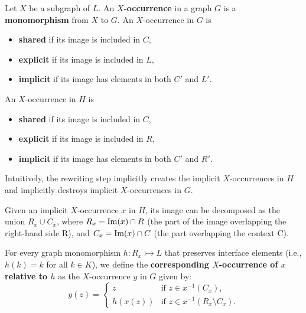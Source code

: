 \begin{definition}
    \label{def:x_occurrence}
     Let $X$ be a subgraph of $L$.  An \textbf{$X$-occurrence} in a graph $G$ is a \textbf{monomorphism} from $X$ to $G$. An $X$-occurrence in $G$ is 
    \begin{itemize}
        \item \textbf{shared} if its image is included in $C$,
        \item \textbf{explicit} if its image is  included in $L$,
        \item \textbf{implicit} if its image has elements in both $C'$ and $L'$.
    \end{itemize}  
    An $X$-occurrence in $H$ is 
    \begin{itemize}
        \item \textbf{shared} if its image is included in $C$,
        \item \textbf{explicit} if its image is included in $R$,
        \item \textbf{implicit} if its image has elements in both $C'$ and $R'$.
    \end{itemize} 

    Intuitively, the rewriting step implicitly creates the implicit $X$-occurrences in $H$ and implicitly destroys implicit $X$-occurrences in $G$. 
    
    Given an implicit $X$-occurrence $x$ in $H$, its image can be decomposed as the union $R_x \cup C_x$, where $R_x = \operatorname{Im}(x) \cap R$ (the part of the image overlapping the right-hand side R), and $C_x = \operatorname{Im}(x) \cap C$ (the part overlapping the context C).
    
    For every graph monomorphism $h : R_x \rightarrowtail L$ that preserves interface elements (i.e., \( h(k) = k \) for all \( k \in K \)), we define the \textbf{corresponding $X$-occurrence of $x$ relative to $h$} as the $X$-occurrence $y$ in $G$ given by:
        $$
        y(z) = 
        \begin{cases}
        z & \text{if } z \in x^{-1}(C_x), \\
        h(x(z)) & \text{if } z \in x^{-1}(R_x \setminus C_x).
        \end{cases}
        $$
   \end{definition} 



